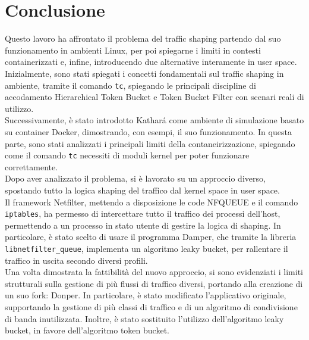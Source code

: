 \chapter{Conclusione}
Questo lavoro ha affrontato il problema del traffic shaping partendo dal suo funzionamento in ambienti Linux, 
per poi spiegarne i limiti in contesti containerizzati e, infine, introducendo due alternative interamente in user space. \\
\vspace*{0.01\textheight}
Inizialmente, sono stati spiegati i concetti fondamentali sul traffic shaping in ambiente, tramite il comando \texttt{tc},
spiegando le principali discipline di accodamento Hierarchical Token Bucket e Token Bucket Filter con scenari reali di utilizzo. \\ 
\vspace*{0.01\textheight}
Successivamente, è stato introdotto Kathará come ambiente di simulazione basato su container Docker, dimostrando, con esempi, il suo funzionamento.
In questa parte, sono stati analizzati i principali limiti della contaneirizzazione, spiegando come il comando \texttt{tc} necessiti di moduli kernel per poter funzionare correttamente. \\
\vspace*{0.01\textheight}
Dopo aver analizzato il problema, si è lavorato su un approccio diverso, spostando tutto la logica shaping del traffico dal kernel space in user space. \\
Il framework Netfilter, mettendo a disposizione le code NFQUEUE e il comando \texttt{iptables}, ha permesso di intercettare tutto il traffico dei processi dell'host, 
permettendo a un processo in stato utente di gestire la logica di shaping. In particolare, è stato scelto di usare il programma Damper, che tramite la libreria \texttt{libnetfilter\_queue}, 
implementa un algoritmo leaky bucket, per rallentare il traffico in uscita secondo diversi profili. \\
\vspace*{0.01\textheight}
Una volta dimostrata la fattibilità del nuovo approccio, si sono evidenziati i limiti strutturali sulla gestione di più flussi di traffico diversi, portando alla creazione di un suo fork: Donper.
In particolare, è stato modificato l'applicativo originale, supportando la gestione di più classi di traffico e di un algoritmo di condivisione di banda inutilizzata.
Inoltre, è stato sostituito l'utilizzo dell'algoritmo leaky bucket, in favore dell'algoritmo token bucket. \\
